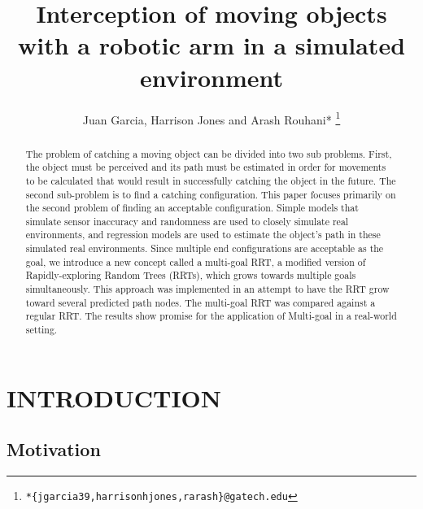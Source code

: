 \documentclass[letterpaper, 10 pt, conference]{ieeeconf}  %
\title{\LARGE \bf
Interception of moving objects with a robotic arm in a simulated environment
}
\author{Juan Garcia, Harrison Jones and Arash Rouhani*
  \thanks{\texttt{*\{jgarcia39,harrisonhjones,rarash\}@gatech.edu}}
}
\begin{document}
\maketitle
\thispagestyle{empty}
\pagestyle{empty}


\begin{abstract}

The problem of catching a moving object can be divided into two sub problems.
First, the object must be perceived and its path must be estimated in order for
movements to be calculated that would result in successfully catching the
object in the future. The second sub-problem is to find a catching
configuration. This paper focuses primarily on the second problem of finding an
acceptable configuration. Simple models that simulate sensor inaccuracy and
randomness are used to closely simulate real environments, and regression
models are used to estimate the object's path in these simulated real
environments. Since multiple end configurations are acceptable as the goal, we
introduce a new concept called a multi-goal RRT, a modified version of
Rapidly-exploring Random Trees (RRTs), which grows towards multiple goals
simultaneously. This approach was implemented in an attempt to have the RRT
grow toward several predicted path nodes. The multi-goal RRT was compared
against a regular RRT. The results show promise for the application of
Multi-goal in a real-world setting.

\end{abstract}

\section{INTRODUCTION}

\subsection{Motivation}
\end{document}
